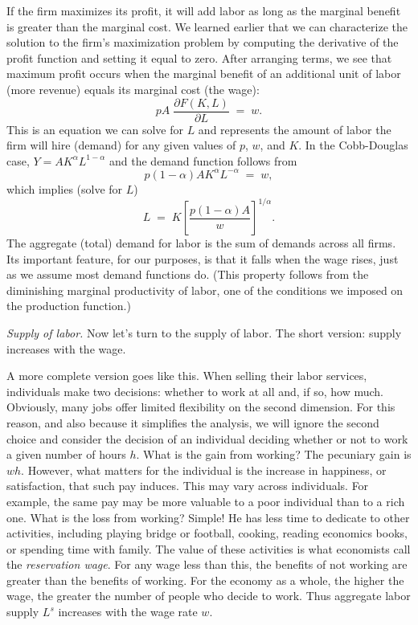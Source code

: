 \documentclass[letterpaper,12pt]{article}
\begin{document}
If the firm maximizes its profit, it will add labor as
long as the marginal benefit is greater than the marginal cost.
We learned earlier that we can characterize the solution
to the firm's maximization problem by computing the derivative
of the profit function and setting it equal to zero.
After arranging terms, we see that maximum profit occurs
when the marginal benefit of an additional unit of labor (more revenue)
equals its marginal cost (the wage):
\[
    p A \; \frac{\partial F(K,L)}{\partial L} \;=\; w .
\]
%
This is an equation we can solve for $L$ and represents the amount
of labor the firm will hire (demand) for any given values of $p$,
$w$, and $K$.  In the Cobb-Douglas case, $ Y = A K^\alpha
L^{1-\alpha}$ and the demand function follows from
%
\begin{equation*}
    p (1-\alpha) A K^{\alpha}L^{-\alpha} \;=\; w ,
\end{equation*}
%
which implies (solve for $L$)
%
\begin{equation}
    L \;=\; K\left[\frac{ p (1-\alpha) A}{w}\right]^{{1}/{\alpha}}.
    \label{eq:ld}
\end{equation}
%
The aggregate (total) demand for labor is the sum of demands
across all firms. Its important feature, for our purposes, is that
it falls when the wage rises, just as we assume most demand
functions do.
(This property follows from the diminishing marginal
productivity of labor, one of the conditions we imposed on the
production function.)

{\it Supply of labor.\/}
Now let's turn to the supply of labor. The short version: supply
increases with the wage.

A more complete version goes like this.
When selling their labor services, individuals
make two decisions: whether to work at all and, if so, how much.
Obviously, many jobs offer limited flexibility on the
second dimension.  For this reason, and also because it simplifies
the analysis, we will ignore the second choice and consider the
decision of an individual deciding whether or not to work a given
number of hours $h$.  What is the gain from working? The pecuniary
gain is $wh$. However, what matters for the individual is the
increase in happiness, or satisfaction, that such pay induces.
This may vary across individuals.  For example, the same pay may
be more valuable to a poor individual than to a rich one. What is
the loss from working? Simple!  He has less time to dedicate to
other activities, including playing bridge or football, cooking,
reading economics books, or spending time with family.
The value of these
activities is what economists call the \textit{reservation wage}.
For any wage less than this, the benefits of not working are
greater than the benefits of working. For the economy as a whole,
the higher the wage, the greater the number of people
who decide to work.
Thus aggregate labor supply $L^{s}$ increases with the wage rate
$w$.
\end{document}
